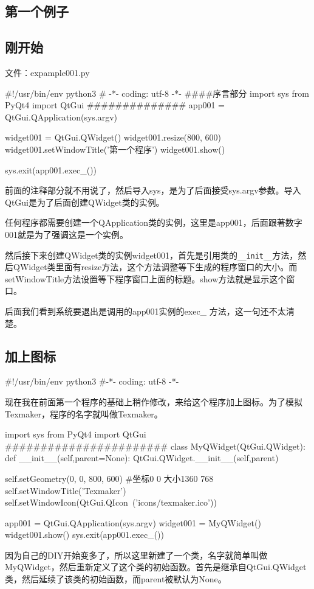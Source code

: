 \documentclass[11pt,oneside]{book}
\begin{document}
\begin{common-format}
\mainmatter

\chapter{第一个例子}
\section{刚开始}
文件：expample001.py
\begin{python}
#!/usr/bin/env python3
# -*- coding: utf-8 -*-
####序言部分
import sys
from PyQt4  import QtGui
##############
app001 = QtGui.QApplication(sys.argv)

widget001 = QtGui.QWidget()
widget001.resize(800, 600)
widget001.setWindowTitle('第一个程序')
widget001.show()

sys.exit(app001.exec_())
\end{python}
前面的注释部分就不用说了，然后导入sys，是为了后面接受sys.argv参数。导入QtGui是为了后面创建QWidget类的实例。

任何程序都需要创建一个QApplication类的实例，这里是app001，后面跟著数字001就是为了强调这是一个实例。

然后接下来创建QWidget类的实例widget001，首先是引用类的\verb+__init__+方法，然后QWidget类里面有resize方法，这个方法调整等下生成的程序窗口的大小。而setWindowTitle方法设置等下程序窗口上面的标题。show方法就是显示这个窗口。

后面我们看到系统要退出是调用的app001实例的exec\_ 方法，这一句还不太清楚。


\section{加上图标}
\begin{python}
#!/usr/bin/env python3
#-*- coding: utf-8 -*-
\end{python}
现在我在前面第一个程序的基础上稍作修改，来给这个程序加上图标。为了模拟Texmaker，程序的名字就叫做Texmaker。
\begin{python}
import sys
from PyQt4  import QtGui
#######################
class MyQWidget(QtGui.QWidget):
    def __init__(self,parent=None):
        QtGui.QWidget.__init__(self,parent)

        self.setGeometry(0, 0, 800, 600)
        #坐标0 0 大小1360 768
        self.setWindowTitle('Texmaker')
        self.setWindowIcon(QtGui.QIcon\
        ('icons/texmaker.ico'))

app001 = QtGui.QApplication(sys.argv)
widget001 = MyQWidget()
widget001.show()
sys.exit(app001.exec_())
\end{python}
因为自己的DIY开始变多了，所以这里新建了一个类，名字就简单叫做MyQWidget，然后重新定义了这个类的初始函数。首先是继承自QtGui.QWidget类，然后延续了该类的初始函数，而parent被默认为None。


\end{common-format}
\end{document}
